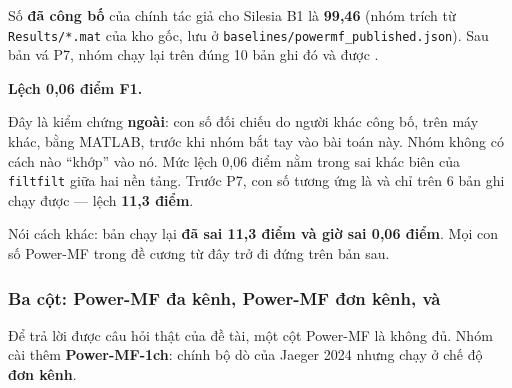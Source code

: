 \begin{ghichu}[title={Kiểm chứng ngoài --- bằng chứng mạnh nhất rằng cổng chuyển giờ đã đúng}]
Số \textbf{đã công bố} của chính tác giả cho Silesia B1 là \textbf{99,46} (nhóm trích từ
\texttt{Results/*.mat} của kho gốc, lưu ở \texttt{baselines/powermf\_published.json}).
Sau bản vá P7, nhóm chạy lại trên đúng 10 bản ghi đó và được .

\textbf{Lệch 0,06 điểm F1.}

Đây là kiểm chứng \textbf{ngoài}: con số đối chiếu do người khác công bố, trên máy khác, bằng MATLAB,
trước khi nhóm bắt tay vào bài toán này. Nhóm không có cách nào ``khớp'' vào nó. Mức lệch 0,06 điểm nằm
trong sai khác biên của \texttt{filtfilt} giữa hai nền tảng. Trước P7, con số tương ứng là 
và chỉ trên 6 bản ghi chạy được --- lệch \textbf{11,3 điểm}.

Nói cách khác: bản chạy lại \textbf{đã sai 11,3 điểm và giờ sai 0,06 điểm}. Mọi con số Power-MF trong
đề cương từ đây trở đi đứng trên bản sau.
\end{ghichu}

\subsubsection{Ba cột: Power-MF đa kênh, Power-MF đơn kênh, và \hethong{}}

Để trả lời được câu hỏi thật của đề tài, một cột Power-MF là không đủ. Nhóm cài thêm
\textbf{Power-MF-1ch}: chính bộ dò của Jaeger 2024 nhưng chạy ở chế độ \textbf{đơn kênh}.

